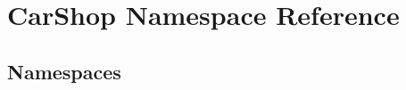 \hypertarget{namespace_car_shop}{}\section{Car\+Shop Namespace Reference}
\label{namespace_car_shop}
\subsection*{Namespaces}
\begin{DoxyCompactItemize}
\end{DoxyCompactItemize}

